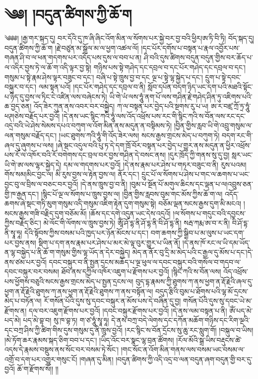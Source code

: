 \setcounter{footnote}{0} 
\chapter{༄༅། །བདུན་ཚིགས་ཀྱི་ཆོ་ག}༄༅༅། །རྒྱ་གར་སྐད་དུ། བར་དོའི་དུ་ཁ་ཞི་ཞིང་འོག་མིན་ལ་སོགས་པར་སྐྱེ་བར་བྱ་བའི་ཕྱིར།ཨ་ཏི་བི་ཏི། བོད་སྐད་དུ། བདུན་ཚིགས་ཀྱི་ཆོ་ག །རྗེ་བཙུན་མ་སྒྲོལ་མ་ལ་ཕྱག་འཚལ་ལོ། །དང་པོར་དགོས་པ་བསྟན་པ་རྣལ་འབྱོར་པས་གཞན་ཤི་བ་ལ་ཕན་གདགས་པར་འདོད་པས་དུས་ལ་བབ་པ་ན། ཤི་བའི་དུས་ཚིགས་བདུན་བདུན་གྱིས་བར་ཆོད་པ་ལ་འདིར་བྱས་ཏེ་ལ་ཆོ་ག་འདི་ལྟར་བྱ་སྟེ། གཉིས་པས་སྟེ་གཤེད་དང་དབྲལ་བ་དང་པོར་གཤེད་དང་དབྲལ་བ་དང་། གསུམ་པ་སྟེ་རྣམ་ཤེས་ལྟར་བཟུང་བ་དང་། བཞི་པ་སྟེ་ཁྲུས་བྱ་བ་དང ལྔ་པ་སྟེ་ལྷ་སྐྱེད་པ་དང་། དྲུག་པ་སྟེ་དབང་བསྐུར་བ་དང་། ལམ་སྟན་པའོ། །དང་པོར་གཤེད་དང་དབྲལ་བ་ནི། སློབ་དཔོན་བདག་ཉིད་ཡང་དག་པའི་མཐའི་སྟོང་པ་ཉིད་དུ་བྱས་ལ་ཏིང་ངེ་འཛིན་ལས་བཞེངས་ཏེ། ཡི་གེ་ཡཾ་ལས་ཧཱུཾ་ནག་པོ་ལས་གཤིན་རྗེ་གཤེད་ཤིན་ཏུ་འཇིགས་པའི་ཆ་བྱད་ཅན། འོད་ཟེར་ཀུན་ནས་འབར་བར་བསྐྱེད། ཀ་ལ་བསྟན་པར་བྱེད་པའི་སྔགས་རུ་པ་ཡ། ཨ་ར་བཛྲ་ཀྲོ་ཏྲ་ཧཱུཾ་ཕཊ།ཅེས་བརྗོད་པར་བྱའོ། །དེ་ནས་ཡང་སྙིང་ཀའི་ཧཱུཾ་ལས་འོད་འཕྲོས་པས་རང་གི་སྙིང་ཀའི་ས་བོན་ལས་རང་དང་འདྲ་བའི་ཡེ་ཤེས་སེམས་དཔའ་བཀུག་ལ་འོག་མིན་ནས་མདུན་ན་བསྟིམས་ཏེ། །བྱིན་གྱིས་རླབ་ཡི་གེ་འབྲུ་གསུམ་ལ་ལན་གསུམ་བརྗོད་དང་། །ཡང་ཐུགས་ཀའི་ཧཱུཾ་གི་འོད་ཟེར་ལས། སངས་རྒྱས་གྲངས་མེད་པ་བཀུག་ཏེ། བདག་རང་གི་ཞལ་དུ་ཞུགས་པ་ལས། །ཞེ་སྡང་འདུལ་བའི་པུ་ཏ་དེ་དག་ཁྲོ་བོར་བསྟན་པར་བྱེད་པ་གྱུར་ནས་མདུན་ན་ཕྱིར་འཕྲོས་པས་རོ་ལ་འཁོར་བའི་རོ་བགེགས་དང་བྲལ་བར་བྱས་གཤིན་དེ་བསང་ནས། །དུར་ཁྲོད་ཀྱི་གནས་སུ་དུ་བྱ། སླར་ཡང་ཡི་གེ་ཨ་ལས་ལྷར་སྐྱེད་དེ། དམ་ལ་གདགས་པར་བྱའོ། །དེ་ནས་རྣམ་པར་ཤེས་པ་གཏར་བཟུང་བ་ནི། རུས་པའམ། གོས་སམ།མིང་བྱང་ལ། མི་རུས་བྱས་ལ་རྟེན་བྱས་ལ། ནོར་དང་། དྲུང་པོ་ལ་སོགས་པ་ཤེས་པ་གང་ལ་ཆགས་པ་ཡང་བྱང་བུ་ལ་བྲིས་ལ་བཅང་བར་བྱའོ། །དེ་ནས་ཁྲུས་བྱ་བ་ནི། །བུམ་པ་སྔོན་པོ་མགུལ་ཆིངས་དང་ལྡན་པ་ལ།འབྲུས་ཅན་གྱི་ཁ་རྒྱན་དང་། །སྙིང་པོ་ལྔ་ལ་སོགས་པ་ཁྲུས་བྱས་ལ། །བྱིན་གྱིས་རླབས་བུམ་གང་མོས་ཀྱིས་ཆོ་ག་ལ། འདོད་ཆགས་ཞེ་སྡང་གཏི་མུག་གསུམ་འདི་གསུམ་འཇིག་རྟེན་དུག་གསུམ་སྟེ། བཅོམ་ལྡན་སངས་རྒྱས་དུག་མི་མངའ། །སངས་རྒྱས་གཟི་བརྗིད་དུག་བཅོམ་མོ། །ཆོས་དང་དགེ་འདུན་ཡང་དེས་འདྲའོ། །ལ་སོགས་པ་གདུང་བའི་དབྱངས་ཀྱིས་བརྗོད་ཅིང་། མེ་ལོང་གི་ལོགས་ལ་ཁྲུས་བྱས་ཏེ། ཨཱོཾ་ཤོ་དྷ་ནི་ཤོ་དྷ་ནི་བི་ཤོ་དྷ་ནི། སརྦ་ཀརྨ་ཨ་བ་ར་ནི། བི་ཤོ་དྷ་ནི་སྭཱ་ཧཱ། དེའི་སྟོབས་ཀྱིས་བསམ་པའི་ཁྱད་པར་ཉོན་མོངས་པ་དང་། བག་ཆགས་ཀྱི་སྒྲིབ་པ་མ་ལུས་པ་ཡང་དག་པར་བྱས་ནས། སྡིག་པ་དག་ནས་རྣམ་པར་ཤེས་པ་མར་མེ་ལྟ་བུར་གྱུར་པ་ཡིན་ནོ། །དེ་ནས་ཁོ་རང་ལ་ཡི་དམ་ཡོད་ན་ལྷ་བསྐྱེད་པ་ནི་ཆོ་ག་གསུམ་གྱིས་ལྷ་ཡོད་ན་དེར་བསྐྱེད། མེད་ན་ནོར་བུ་དྲི་མ་མེད་པའི་ང་རྒྱལ་དུ་མོས་པ་དང་།དེ་ནས་ཙམ་པར་བྱའོ། དབང་བསྐུར་བ་ནི་སྤྱན་དྲངས་མཆོད་པ་ལྔ་ཕུལ་ལ་དབང་བསྐུར་བའི་གསོལ་བ་གདབ་ལ་དབང་བསྐུར་བར་བསམ། ཐོབ་ནས་དཀྱིལ་འཁོར་འཇུག་པ་རྫོགས་པར་བྱའོ། །སྙིང་ཀའི་ས་བོན་ལས། འོད་འཕྲོས་པས་ཕྱོགས་བཅུའི་སངས་རྒྱས་གྲངས་མེད་པ་སྤྱན་དྲངས་ལ། བུད་དྷ་རྣམས་ཀྱི་ཐུགས་ཀ་ནས་ཕྱག་ན་རྡོ་རྗེའི་ཞལ་དུ་ཕྱག་ན་རྡོ་རྗེའི་ཐུགས་ཀ་ནས་ཕྱག་ན་རྡོ་རྗེའི་ཐུགས་ཀ་ནས་བསྟོན་ལ། བདུད་རྩིའི་བུམ་པ་ཐོགས་པའི་ལྷ་མོ་དྲངས་མེད་པ་བཏོན་ལ། རོ་གསོན་པོའི་དུས་སུ་དབང་བསྐུར་ན་མོས་པས་དེ་བཞིན་དུ་བྱ། གསོན་པོའི་དུས་སུ་དབང་ཡེ་མ་རྫོགས་ན། དལ་བར་འཇུག་རྫོགས་པར་བྱའོ། །དབང་བསྐུར་རྫོགས་པར་བྱའོ། །དེ་ནས་ལམ་བསྟན་པ་ནི། ཨོཾ་པད་མེ་པད་མེ། པད་མེ་བྷ་བ། སུ་ཁ་བྷ་ཏ། ག་ཙ་ཧཱུཾ་སྭཱ་ཧཱ། དེ་ནས་བཀྲ་བདེ་ལེགས་དང་དཀོན་མཆོག་གཉིས་དང་རིག་ལྔའི་དང་བཀྲ་ཤིས་ཀྱི་ཚིག་གིས་དུས་གསུམ་དུ་ནི་ཁྲུས་བྱའོ། །རང་སྙིང་ས་བོན་དྲོངས་སུ་ཆུ་རང་སླུག་གོ། །བསྐུལ་བ་ཡིས། །མེ་ཏོག་ཆར་རྣམས་སྐད་ཅིག་བབ་པ་དང་། །ཡིད་འོང་བར་སྣང་ལྷ་བྲན་ཚོགས། །རོལ་མོའི་སྒྲ་ཡིས་བརྡུངས་ཚེ་འདས་དེ་རྣམས་བསྡུས་ནས་སོང་བར་བསམ་ཏེ་སོང་། །གང་སོང་ན་འོག་མིན་གནས་ལས་བསམ་ཡང་བསམ་ལ་འགྲོ་བ་དག་པར་འགྱུར་གསུང་ངོ། །གཞན་དུ་མིན། །བདུན་ཚིགས་ཀྱི་འདི་འདྲ་བ་ལན་བདུན་ཞག་བདུན་གྱི་བར་དུ་བྱའོ། ཆོ་ག་རྫོགས་སོ།། །།